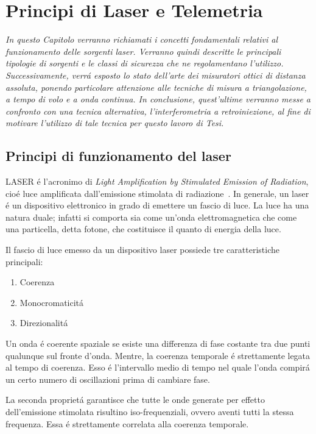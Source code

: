 \chapter{Principi di Laser e Telemetria}
\label{capitolo1}
\thispagestyle{empty}

\textit{In questo Capitolo verranno richiamati i concetti fondamentali relativi al funzionamento delle sorgenti laser. Verranno quindi descritte le principali tipologie di sorgenti e le classi di sicurezza che ne regolamentano l'utilizzo. Successivamente, verr\'a esposto lo stato dell'arte dei misuratori ottici di distanza assoluta, ponendo particolare attenzione alle tecniche di misura a triangolazione, a tempo di volo e a onda continua. In conclusione, quest'ultime verranno messe a confronto con una tecnica alternativa, l'interferometria a retroiniezione, al fine di motivare l'utilizzo di tale tecnica per questo lavoro di Tesi.}

\section{Principi di funzionamento del laser}
LASER \'e l'acronimo di \emph{Light Amplification by Stimulated Emission of Radiation}, cio\'e luce amplificata dall'emissione stimolata di radiazione~\cite{sveltolaser}. In generale, un laser \'e un dispositivo elettronico in grado di emettere un fascio di luce.
La luce ha una natura duale; infatti si comporta sia come un'onda elettromagnetica che come una particella, detta fotone, che costituisce il quanto di energia della luce. 

Il fascio di luce emesso da un dispositivo laser possiede tre caratteristiche principali:
\begin{enumerate}
	\item Coerenza
	\item Monocromaticit\'a
	\item Direzionalit\'a
\end{enumerate}

Un onda \'e coerente spaziale se esiste una differenza di fase costante tra due punti qualunque sul fronte d'onda. Mentre, la coerenza temporale \'e strettamente legata al tempo di coerenza. Esso \'e l'intervallo medio di tempo nel quale l'onda compir\'a un certo numero di oscillazioni prima di cambiare fase.

La seconda propriet\'a garantisce che %
tutte le onde generate per effetto dell'emissione stimolata risultino iso-frequenziali, ovvero aventi tutti la stessa frequenza. Essa \'e strettamente correlata alla coerenza temporale.

